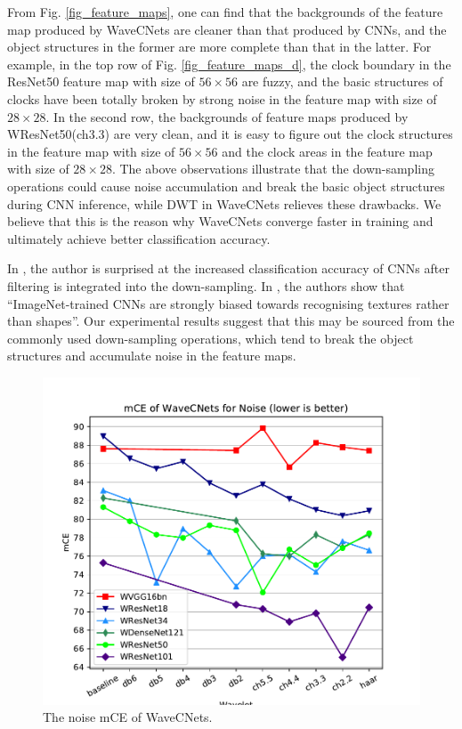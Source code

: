 \documentclass[10pt,twocolumn,letterpaper]{article}
\begin{document}
From Fig. \ref{fig_feature_maps}, one can find
that the backgrounds of the feature map produced by WaveCNets are cleaner than that produced by CNNs,
and the object structures in the former are more complete than that in the latter.
For example, in the top row of Fig. \ref{fig_feature_maps_d},
the clock boundary in the ResNet50 feature map with size of $56\times56$ are fuzzy,
and the basic structures of clocks have been totally broken by strong noise in the feature map with size of $28\times28$.
In the second row,
the backgrounds of feature maps produced by WResNet50(ch3.3) are very clean,
and it is easy to figure out the clock structures in the feature map with size of $56\times56$
and the clock areas in the feature map with size of $28\times28$.
The above observations illustrate that the down-sampling operations could cause noise accumulation
and break the basic object structures during CNN inference,
while DWT in WaveCNets relieves these drawbacks.
We believe that this is the reason why WaveCNets converge faster in training and ultimately achieve better classification accuracy.

In \cite{zhang2019making}, the author is surprised at the increased classification accuracy of CNNs
after filtering is integrated into the down-sampling.
In \cite{geirhos2018imagenet},
the authors show that ``ImageNet-trained CNNs are strongly biased towards recognising textures rather than shapes''.
Our experimental results suggest that this may be sourced from the commonly used down-sampling operations,
which tend to break the object structures and accumulate noise in the feature maps.

\begin{figure}[bpt]
	\centering
	\includegraphics*[scale=0.5, viewport=23 8 418 370]{figures/mCE_noise.pdf}
	\caption{The noise mCE of WaveCNets.}
	\label{fig_mCE_noise}
\end{figure}
\end{document}
